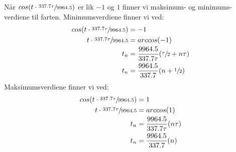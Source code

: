 \documentclass{../../myassignment}
\begin{document}
	\begin{answer}
		N{\aa}r $cos(t\cdot \sfrac{337.7\tau}{9964.5})$ er lik $-1$ og $1$ finner vi maksimum- og minimums-verdiene til farten. 
		Minimumsverdiene finner vi ved:
			\begin{align}
			 	cos(t\cdot \sfrac{337.7\tau}{9964.5}) &= -1 \\
			 	t\cdot \sfrac{337.7\tau}{9964.5} &= arccos(-1) \\
			 	t_n &= \frac{9964.5}{337.7\tau} (\sfrac{\tau}{2}+n \tau)\\
			 	t_n &= \frac{9964.5}{337.7} (n + \sfrac{1}{2})
			 \end{align}
		Maksimumsverdiene finner vi ved:
			\begin{align}
			 	cos(t\cdot \sfrac{337.7\tau}{9964.5}) &= 1 \\
			 	t\cdot \sfrac{337.7\tau}{9964.5} &= arccos(1) \\
			 	t_n &= \frac{9964.5}{337.7\tau} (n \tau)\\
			 	t_n &= \frac{9964.5}{337.7} (n)
			 \end{align}
	\end{answer}
\end{document}
